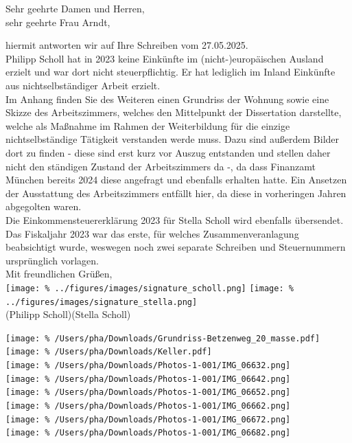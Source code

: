 \documentclass[
  fontsize=11pt,
  paper=a4,
  parskip=half,
  enlargefirstpage=on,    %
  fromalign=right,        %
  fromphone=on,           %
  fromrule=aftername,     %
  addrfield=off,           %
  backaddress=off,         %
  subject=beforeopening,  %
  locfield=narrow,        %
  foldmarks=on,           %
]{scrlttr2}
\begin{document}
\begin{letter}{}
%
%
  \opening{
    Sehr geehrte Damen und Herren,\\%
    sehr geehrte Frau Arndt,%
}%
%
  hiermit antworten wir auf Ihre Schreiben vom 27.05.2025.\\[0.5cm]%
%
  Philipp Scholl hat in 2023 keine Einkünfte im (nicht-)europäischen Ausland erzielt und war dort nicht steuerpflichtig. Er hat lediglich im Inland Einkünfte aus nichtselbständiger Arbeit erzielt.\\[0.5cm]%
%
  Im Anhang finden Sie des Weiteren einen Grundriss der Wohnung sowie eine Skizze des Arbeitszimmers, welches den Mittelpunkt der Dissertation darstellte, welche als Maßnahme im Rahmen der Weiterbildung für die einzige nichtselbständige Tätigkeit verstanden werde muss. Dazu sind außerdem Bilder dort zu finden - diese sind erst kurz vor Auszug entstanden und stellen daher nicht den ständigen Zustand der Arbeitszimmers da -, da dass Finanzamt München bereits 2024 diese angefragt und ebenfalls erhalten hatte. Ein Ansetzen der Ausstattung des Arbeitszimmers entfällt hier, da diese in vorheringen Jahren abgegolten waren.\\[0.5cm]%
%
  Die Einkommensteuererklärung 2023 für Stella Scholl wird ebenfalls übersendet. Das Fiskaljahr 2023 war das erste, für welches Zusammenveranlagung beabsichtigt wurde, weswegen noch zwei separate Schreiben und Steuernummern ursprünglich vorlagen.\\[0.5cm]%
%
  Mit freundlichen Grüßen,\\[.5cm]%
  \texttt{[image: \%
    ../figures/images/signature\_scholl.png]}%
  \hspace*{1.5cm}%
  \texttt{[image: \%
    ../figures/images/signature\_stella.png]}\\[-0.5cm]%
  (Philipp Scholl)\hspace*{2.5cm}(Stella Scholl)%
%
  \begin{center}%
    \texttt{[image: \%
      /Users/pha/Downloads/Grundriss-Betzenweg\_20\_masse.pdf]}\\%
    \texttt{[image: \%
      /Users/pha/Downloads/Keller.pdf]}\\%
    \texttt{[image: \%
      /Users/pha/Downloads/Photos-1-001/IMG\_06632.png]}\\%
    \texttt{[image: \%
      /Users/pha/Downloads/Photos-1-001/IMG\_06642.png]}\\%
    \texttt{[image: \%
      /Users/pha/Downloads/Photos-1-001/IMG\_06652.png]}\\%
    \texttt{[image: \%
      /Users/pha/Downloads/Photos-1-001/IMG\_06662.png]}\\%
    \texttt{[image: \%
      /Users/pha/Downloads/Photos-1-001/IMG\_06672.png]}\\%
    \texttt{[image: \%
      /Users/pha/Downloads/Photos-1-001/IMG\_06682.png]}%
  \end{center}%
%
\end{letter}
\end{document}
